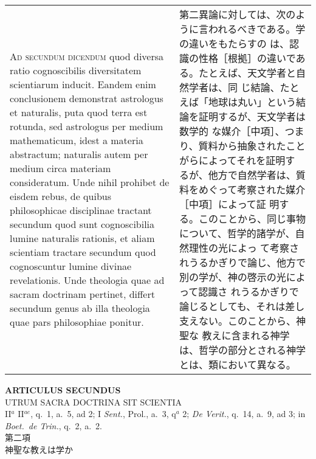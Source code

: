 \documentclass[10pt]{jsarticle}
\begin{document}
\begin{longtable}{p{21em}p{21em}}
\\



{\scshape Ad secundum dicendum} quod diversa ratio cognoscibilis diversitatem
scientiarum inducit. Eandem enim conclusionem demonstrat astrologus et
naturalis, puta quod terra est rotunda, sed astrologus per medium
mathematicum, idest a materia abstractum; naturalis autem per medium
circa materiam consideratum. Unde nihil prohibet de eisdem rebus, de
quibus philosophicae disciplinae tractant secundum quod sunt
cognoscibilia lumine naturalis rationis, et aliam scientiam tractare
secundum quod cognoscuntur lumine divinae revelationis. Unde theologia
quae ad sacram doctrinam pertinet, differt secundum genus ab illa
theologia quae pars philosophiae ponitur.


&

第二異論に対しては、次のように言われるべきである。学の違いをもたらすの
は、認識の性格［根拠］の違いである。たとえば、天文学者と自然学者は、同
じ結論、たとえば「地球は丸い」という結論を証明するが、天文学者は数学的
な媒介［中項］、つまり、質料から抽象されたことがらによってそれを証明す
るが、他方で自然学者は、質料をめぐって考察された媒介［中項］によって証
明する。このことから、同じ事物について、哲学的諸学が、自然理性の光によっ
て考察されうるかぎりで論じ、他方で別の学が、神の啓示の光によって認識さ
れうるかぎりで論じるとしても、それは差し支えない。このことから、神聖な
教えに含まれる神学は、哲学の部分とされる神学とは、類において異なる。


\end{longtable}

\newpage


\begin{center}
 {\Large {\bf ARTICULUS SECUNDUS}}\\
 {\large UTRUM SACRA DOCTRINA SIT SCIENTIA}\\
 {\footnotesize II$^a$ II$^{ae}$, q.~1, a.~5, ad 2; I {\itshape Sent.},
 Prol., a.~3, q$^a$ 2; {\itshape De Verit.}, q.~14, a.~9, ad 3; in
 {\itshape Boet.~de Trin.}, q.~2, a.~2.}\\
 {\Large 第二項\\神聖な教えは学か}
\end{center}
\end{document}
